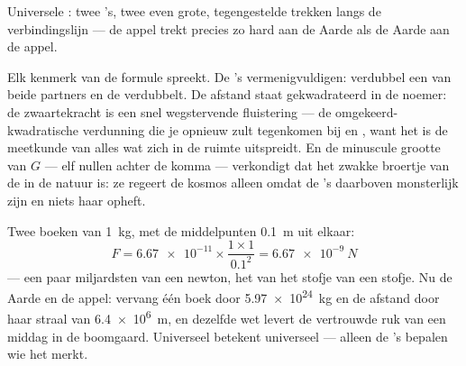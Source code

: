 \begin{omfigure}

{\small Universele : twee 's, twee even grote,
tegengestelde trekken langs de verbindingslijn --- de appel trekt
precies zo hard aan de Aarde als de Aarde aan de appel.}
\end{omfigure}

\begin{example}\label{ex:g9:gravitation:reading}
Elk kenmerk van de formule spreekt. De 's vermenigvuldigen:
verdubbel een van beide partners en de  verdubbelt. De
afstand staat gekwadrateerd in de noemer: de zwaartekracht is een snel
wegstervende fluistering --- de omgekeerd-kwadratische verdunning die je
opnieuw zult tegenkomen bij  en , want het
is de meetkunde van alles wat zich in de ruimte uitspreidt. En de
minuscule grootte van $G$ --- elf nullen achter de komma --- verkondigt
dat  het zwakke broertje van de
 in de natuur is: ze regeert de kosmos alleen omdat de
's daarboven monsterlijk zijn en niets haar opheft.
\end{example}

\begin{example}\label{ex:g9:gravitation:books}
Twee boeken van \qty{1}{kg}, met de middelpunten \qty{0.1}{m} uit
elkaar:
\[
F = \num{6.67e-11} \times \frac{1 \times 1}{0.1^2}
= \qty{6.67e-9}{N}
\]
--- een paar miljardsten van een newton, het  van het
stofje van een stofje. Nu de Aarde en de appel: vervang één boek door
\qty{5.97e24}{kg}  en de afstand door haar straal van
\qty{6.4e6}{m}, en dezelfde wet levert de vertrouwde ruk van een middag
in de boomgaard. Universeel betekent universeel --- alleen de 's
bepalen wie het merkt.
\end{example}

